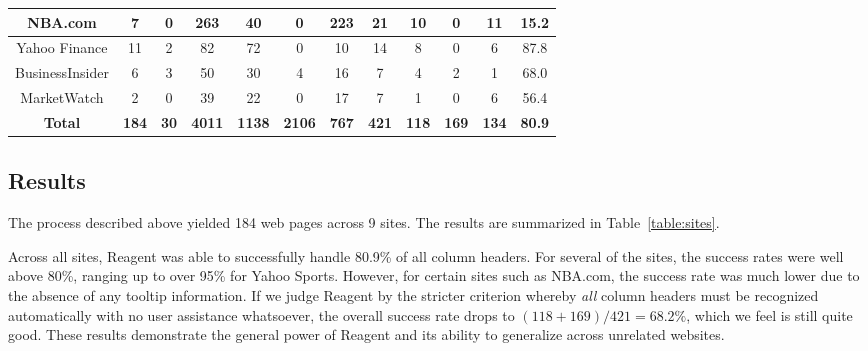 \begin{table*}[hbtp]
\begin{tabular}{ |c|c|c|c|c|c|c|c|c|c|c|c| }
 \hline
 NBA.com & 7 & 0 & 263 & 40 & 0 & 223 & 21 & 10 & 0 & 11 & 15.2 \\
 \hline
 Yahoo Finance & 11 & 2 & 82 & 72 & 0 & 10 & 14 & 8 & 0 & 6 & 87.8 \\
 \hline
 BusinessInsider & 6 & 3 & 50 & 30 & 4 & 16 & 7 & 4 & 2 & 1 & 68.0\\
 \hline
 MarketWatch & 2 & 0 & 39 & 22 & 0 & 17 & 7 & 1 & 0 & 6 & 56.4 \\
 \hline
 {\bf Total} & {\bf 184} & {\bf 30} & {\bf 4011} & {\bf 1138} & {\bf 2106} & {\bf 767} & {\bf 421} & {\bf 118} & {\bf 169} & {\bf 134} & {\bf 80.9}\\
 \hline
\end{tabular}
\caption{Experimental Results for 9 sites with 184 pages containing tables. See above for definitions of column headings. V = Verbatim, I = Interpretable, NI = Non-interpretable.}
\label{table:sites}
\end{table*}

\subsection{Results}

The process described above yielded 184 web pages across 9 sites.
The results are summarized in  Table~\ref{table:sites}.

Across all sites, Reagent was able to successfully handle 80.9\% of all column headers. For several of the sites,
the success rates were well above 80\%, ranging up to over 95\% for Yahoo Sports.
However, for certain sites such as NBA.com, the success rate was much lower due to the absence of any
tooltip information. If we judge Reagent by the stricter criterion whereby {\em all} column headers must be
recognized automatically with no user assistance whatsoever, the overall success rate drops to
$(118 + 169) / 421 = 68.2\%$, which we feel is still quite good. These results demonstrate the general power of
Reagent and its ability to generalize across unrelated websites.

